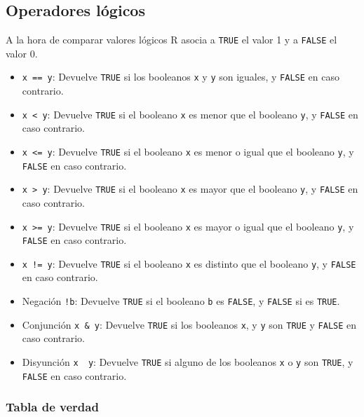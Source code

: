\documentclass[
]{book}
\providecommand{\tightlist}{%
  \setlength{\itemsep}{0pt}\setlength{\parskip}{0pt}}
\theoremstyle{definition}
\theoremstyle{definition}
\theoremstyle{definition}
\theoremstyle{definition}
\theoremstyle{remark}
\begin{document}
\hypertarget{operadores-luxf3gicos}{%
\subsection{Operadores lógicos}\label{operadores-luxf3gicos}}

A la hora de comparar valores lógicos R asocia a \texttt{TRUE} el valor 1 y a \texttt{FALSE} el valor 0.

\begin{itemize}
\tightlist
\item
  \texttt{x\ ==\ y}: Devuelve \texttt{TRUE} si los booleanos \texttt{x} y \texttt{y} son iguales, y \texttt{FALSE} en caso contrario.
\item
  \texttt{x\ \textless{}\ y}: Devuelve \texttt{TRUE} si el booleano \texttt{x} es menor que el booleano \texttt{y}, y \texttt{FALSE} en caso contrario.
\item
  \texttt{x\ \textless{}=\ y}: Devuelve \texttt{TRUE} si el booleano \texttt{x} es menor o igual que el booleano \texttt{y}, y \texttt{FALSE} en caso contrario.
\item
  \texttt{x\ \textgreater{}\ y}: Devuelve \texttt{TRUE} si el booleano \texttt{x} es mayor que el booleano \texttt{y}, y \texttt{FALSE} en caso contrario.
\item
  \texttt{x\ \textgreater{}=\ y}: Devuelve \texttt{TRUE} si el booleano \texttt{x} es mayor o igual que el booleano \texttt{y}, y \texttt{FALSE} en caso contrario.
\item
  \texttt{x\ !=\ y}: Devuelve \texttt{TRUE} si el booleano \texttt{x} es distinto que el booleano \texttt{y}, y \texttt{FALSE} en caso contrario.
\item
  Negación \texttt{!b}: Devuelve \texttt{TRUE} si el booleano \texttt{b} es \texttt{FALSE}, y \texttt{FALSE} si es \texttt{TRUE}.
\item
  Conjunción \texttt{x\ \&\ y}: Devuelve \texttt{TRUE} si los booleanos \texttt{x}, y \texttt{y} son \texttt{TRUE} y \texttt{FALSE} en caso contrario.
\item
  Disyunción \texttt{x\ \textbar{}\ y}: Devuelve \texttt{TRUE} si alguno de los booleanos \texttt{x} o \texttt{y} son \texttt{TRUE}, y \texttt{FALSE} en caso contrario.
\end{itemize}

\hypertarget{tabla-de-verdad}{%
\subsubsection*{Tabla de verdad}\label{tabla-de-verdad}}
\end{document}

